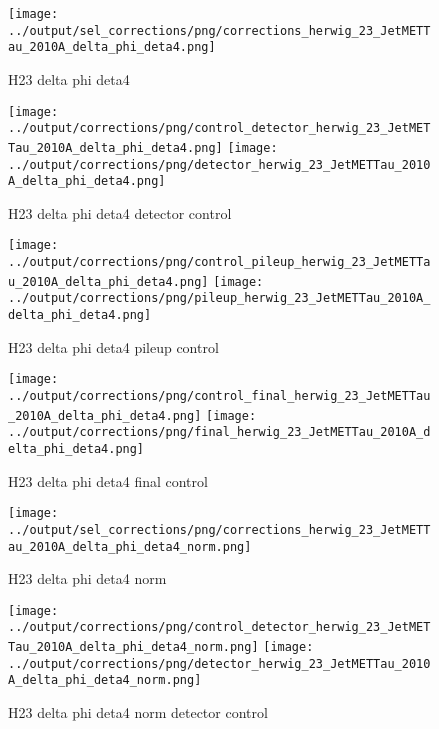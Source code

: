 \documentclass[11pt]{book}
\begin{document}
\begin{figure}[ht]
\centering
\texttt{[image: ../output/sel\_corrections/png/corrections\_herwig\_23\_JetMETTau\_2010A\_delta\_phi\_deta4.png]}
\caption{H23 delta phi deta4}
\label{fig:H23_JetMETTau_2010A_delta_phi_deta4}
\end{figure}


\begin{figure}[ht]
\centering
\texttt{[image: ../output/corrections/png/control\_detector\_herwig\_23\_JetMETTau\_2010A\_delta\_phi\_deta4.png]}
\texttt{[image: ../output/corrections/png/detector\_herwig\_23\_JetMETTau\_2010A\_delta\_phi\_deta4.png]}
\caption{H23 delta phi deta4 detector control}
\label{fig:H23_JetMETTau_2010A_delta_phi_deta4_detector_control}
\end{figure}

\begin{figure}[ht]
\centering
\texttt{[image: ../output/corrections/png/control\_pileup\_herwig\_23\_JetMETTau\_2010A\_delta\_phi\_deta4.png]}
\texttt{[image: ../output/corrections/png/pileup\_herwig\_23\_JetMETTau\_2010A\_delta\_phi\_deta4.png]}
\caption{H23 delta phi deta4 pileup control}
\label{fig:H23_JetMETTau_2010A_delta_phi_deta4_pileup_control}
\end{figure}


\begin{figure}[ht]
\centering
\texttt{[image: ../output/corrections/png/control\_final\_herwig\_23\_JetMETTau\_2010A\_delta\_phi\_deta4.png]}
\texttt{[image: ../output/corrections/png/final\_herwig\_23\_JetMETTau\_2010A\_delta\_phi\_deta4.png]}
\caption{H23 delta phi deta4 final control}
\label{fig:H23_JetMETTau_2010A_delta_phi_deta4_final_control}
\end{figure}


\begin{figure}[ht]
\centering
\texttt{[image: ../output/sel\_corrections/png/corrections\_herwig\_23\_JetMETTau\_2010A\_delta\_phi\_deta4\_norm.png]}
\caption{H23 delta phi deta4 norm}
\label{fig:H23_JetMETTau_2010A_delta_phi_deta4_norm}
\end{figure}

\begin{figure}[ht]
\centering
\texttt{[image: ../output/corrections/png/control\_detector\_herwig\_23\_JetMETTau\_2010A\_delta\_phi\_deta4\_norm.png]}
\texttt{[image: ../output/corrections/png/detector\_herwig\_23\_JetMETTau\_2010A\_delta\_phi\_deta4\_norm.png]}
\caption{H23 delta phi deta4 norm detector control}
\label{fig:H23_JetMETTau_2010A_delta_phi_deta4_norm_detector_control}
\end{figure}
\end{document}
